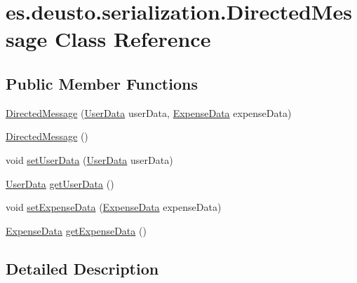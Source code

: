 \hypertarget{classes_1_1deusto_1_1serialization_1_1_directed_message}{}\section{es.\+deusto.\+serialization.\+Directed\+Message Class Reference}
\label{classes_1_1deusto_1_1serialization_1_1_directed_message}
\subsection*{Public Member Functions}
\begin{DoxyCompactItemize}
\item 
\hyperlink{classes_1_1deusto_1_1serialization_1_1_directed_message_a7202c6402fc3820da88d1907d391e2fe}{Directed\+Message} (\hyperlink{classes_1_1deusto_1_1serialization_1_1_user_data}{User\+Data} user\+Data, \hyperlink{classes_1_1deusto_1_1serialization_1_1_expense_data}{Expense\+Data} expense\+Data)
\item 
\hyperlink{classes_1_1deusto_1_1serialization_1_1_directed_message_aa9849ae931af7c774d2e98a15da1a166}{Directed\+Message} ()
\item 
void \hyperlink{classes_1_1deusto_1_1serialization_1_1_directed_message_a4a3f7852410bc29d73179294836e84c4}{set\+User\+Data} (\hyperlink{classes_1_1deusto_1_1serialization_1_1_user_data}{User\+Data} user\+Data)
\item 
\hyperlink{classes_1_1deusto_1_1serialization_1_1_user_data}{User\+Data} \hyperlink{classes_1_1deusto_1_1serialization_1_1_directed_message_a66353c1aa604944db42e4bc569141782}{get\+User\+Data} ()
\item 
void \hyperlink{classes_1_1deusto_1_1serialization_1_1_directed_message_a2f339d3849855fd1fc88cdf6a6c3e2cf}{set\+Expense\+Data} (\hyperlink{classes_1_1deusto_1_1serialization_1_1_expense_data}{Expense\+Data} expense\+Data)
\item 
\hyperlink{classes_1_1deusto_1_1serialization_1_1_expense_data}{Expense\+Data} \hyperlink{classes_1_1deusto_1_1serialization_1_1_directed_message_ad65304c7044bdac65e526dd6f666c1cf}{get\+Expense\+Data} ()
\end{DoxyCompactItemize}


\subsection{Detailed Description}


